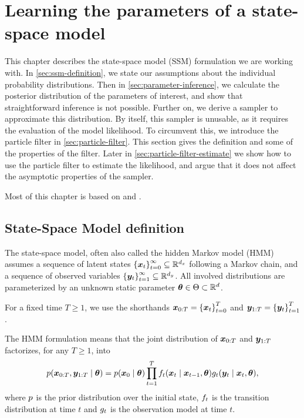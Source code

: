 \chapter{Learning the parameters of a state-space model}
\label{chap:inference}

This chapter describes the state-space model (SSM) formulation we are working with. In \autoref{sec:ssm-definition}, we state our assumptions about the individual probability distributions. Then in \autoref{sec:parameter-inference}, we calculate the posterior distribution of the parameters of interest, and show that straightforward inference is not possible. Further on, we derive a sampler to approximate this distribution. By itself, this sampler is unusable, as it requires the evaluation of the model likelihood. To circumvent this, we introduce the particle filter in \autoref{sec:particle-filter}. This section gives the definition and some of the properties of the filter. Later in \autoref{sec:particle-filter-estimate} we show how to use the particle filter to estimate the likelihood, and argue that it does not affect the asymptotic properties of the sampler.

Most of this chapter is based on \cite{andrieu} and \cite{schoen}.



\section{State-Space Model definition} \label{sec:ssm-definition}
The state-space model, often also called the hidden Markov model (HMM) assumes a sequence of latent states $\left\{\bm{x}_t\right\}_{t=0}^\infty \subseteq \mathbb{R}^{d_x}$ following a Markov chain, and a sequence of observed variables $\left\{\bm{y}_t\right\}_{t=1}^\infty \subseteq \mathbb{R}^{d_y}$. All involved distributions are parameterized by an unknown static parameter $\bm{\theta} \in \Theta \subset \mathbb{R}^d$.

For a fixed time $T \geq 1$, we use the shorthands $\bm{x}_{0:T} = \left\{\bm{x}_t\right\}_{t=0}^T$ and $\bm{y}_{1:T} = \left\{\bm{y}_t\right\}_{t=1}^T$.

The HMM formulation means that the joint distribution of $\bm{x}_{0:T}$ and $\bm{y}_{1:T}$ factorizes, for any $T \geq 1$, into
\begin{equation}\label{eq:factorization}
p(\bm{x}_{0:T}, \bm{y}_{1:T} \mid \bm{\theta}) = p(\bm{x}_0 \mid \bm{\theta}) \prod_{t = 1}^{T} f_t(\bm{x}_t \mid \bm{x}_{t-1}, \bm{\theta}) g_t(\bm{y}_t \mid \bm{x}_t, \bm{\theta}),
\end{equation}
where $p$ is the prior distribution over the initial state, $f_t$ is the transition distribution at time $t$ and $g_t$ is the observation model at time $t$.

